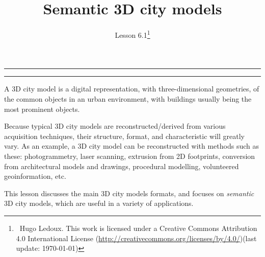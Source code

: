

\newcommand{\lessonNumber}{Lesson 6.1}

\usepackage{listings}
\usepackage{color}
\lstset{style=mystyle,basicstyle=\ttfamily\footnotesize,breaklines=true}


\title{Semantic 3D city models}

\ohead*{\lessonNumber}
\titlehead{\thispagestyle{headings}}
\author{\lessonNumber\footnote{\ccbysa\ Hugo Ledoux. This work is licensed under a Creative Commons Attribution 4.0 International License (\url{http://creativecommons.org/licenses/by/4.0/})\newline(last update: \today)}}
\date{}

\pagestyle{scrheadings}

\maketitle

\noindent\rule{5cm}{0.4pt}
\tableofcontents
\noindent\rule{5cm}{0.4pt}
\vspace{5mm}

A 3D city model is a digital representation,  with three-dimensional geometries, of the common objects in an urban environment, with buildings usually being the most prominent objects. 

Because typical 3D city models are reconstructed/derived from various acquisition techniques, their structure, format, and characteristic will greatly vary.
As an example, a 3D city model can be reconstructed with methods such as these: photogrammetry, laser scanning, extrusion from 2D footprints, conversion from architectural models and drawings, procedural modelling, volunteered geoinformation, etc.

This lesson discusses the main 3D city models formats, and focuses on \emph{semantic} 3D city models, which are useful in a variety of applications.


